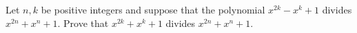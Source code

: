 Let \( n, k\) be positive integers and suppose that the polynomial \( x^{2k}-x^k+1\) divides \( x^{2n}+x^n+1\). Prove that \( x^{2k}+x^k+1\) divides \( x^{2n}+x^n+1\).